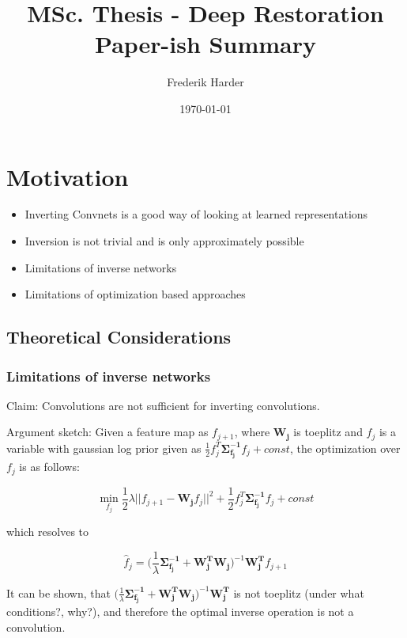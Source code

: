\documentclass{article}
\title{MSc. Thesis - Deep Restoration\\Paper-ish Summary}
\date{\today}
\author{Frederik Harder}
\begin{document}
\maketitle

\section{Motivation}

\begin{itemize}
	\item Inverting Convnets is a good way of looking at learned representations
	\item Inversion is not trivial and is only approximately possible
	\item Limitations of inverse networks 
	\item Limitations of optimization based approaches
\end{itemize}

\subsection{Theoretical Considerations}

\subsubsection{Limitations of inverse networks}

Claim: Convolutions are not sufficient for inverting convolutions.

Argument sketch: Given a feature map as $f_{j+1}$, where $\bm{W_j}$ is toeplitz and $f_j$ is a variable with gaussian log prior given as $\frac{1}{2} f_j^T \bm{\Sigma_{f_j}^{-1}}f_j + const$, the optimization over $f_j$ is as follows:

\begin{equation}
	\min_{f_j} \frac{1}{2} \lambda || f_{j+1} - \bm{W_j} f_j ||^2 + \frac{1}{2} f_j^T \bm{\Sigma_{f_j}^{-1}} f_j + const
\end{equation}

which resolves to 

\begin{equation}
\hat{f}_j =  \bigg( \frac{1}{\lambda}  \bm{\Sigma_{f_j}^{-1}} + \bm{W_j^T} \bm{W_j}\bigg)^{-1} \bm{W_j^T} f_{j+1}
\end{equation}

It can be shown, that $\big( \frac{1}{\lambda}  \bm{\Sigma_{f_j}^{-1}} + \bm{W_j^T} \bm{W_j}\big)^{-1} \bm{W_j^T}$ is not toeplitz (under what conditions?, why?), and therefore the optimal inverse operation is not a convolution.
\end{document}

